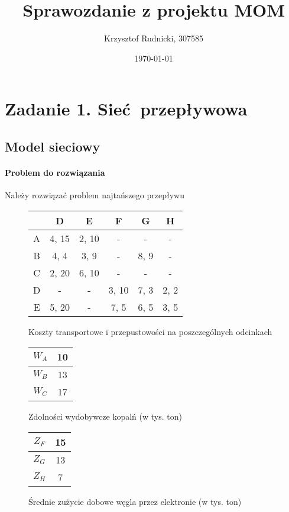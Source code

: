 \documentclass[12pt]{article}
\title{Sprawozdanie z projektu MOM}
\author{Krzysztof Rudnicki, 307585}
\date{\today}
\begin{document}
\maketitle
\section{Zadanie 1. Sieć przepływowa}

\subsection{Model sieciowy}
\paragraph{Problem do rozwiązania}
Należy rozwiązać problem najtańszego przepływu \\
\begin{figure}[htb]
\caption{Koszty transportowe i przepustowości na poszczególnych odcinkach}
\begin{center}
\begin{tabular}{ | c | c | c | c | c | c | }
\hline
  & D & E & F & G & H \\ 
 \hline
 A & 4, 15 & 2, 10 & - & - & -\\  
 \hline
 B & 4, 4 & 3, 9 & - & 8, 9 & - \\
 \hline  
 C & 2, 20 & 6, 10 & - & - & - \\
 \hline  
 D & - & - & 3, 10 & 7, 3 & 2, 2 \\
 \hline  
 E & 5, 20 & - & 7, 5 & 6, 5 & 3, 5 \\
 \hline  
\end{tabular}
\end{center}
\end{figure}
\begin{figure}[htb]
\caption{Zdolności wydobywcze kopalń (w tys. ton)}
\begin{center}
\begin{tabular}{ | c | c |}
\hline
  $W_A$ & 10 \\
 \hline
$W_B$ & 13 \\
 \hline
 $W_C$ & 17 \\
 \hline  
\end{tabular}
\end{center}
\end{figure}
\begin{figure}[htb]
\caption{Średnie zużycie dobowe węgla przez elektronie (w tys. ton)}
\begin{center}
\begin{tabular}{ | c | c |}
\hline
  $Z_F$ & 15 \\
 \hline
$Z_G$ & 13 \\
 \hline
 $Z_H$ & 7 \\
 \hline  
\end{tabular}
\end{center}
\end{figure}
\end{document}
